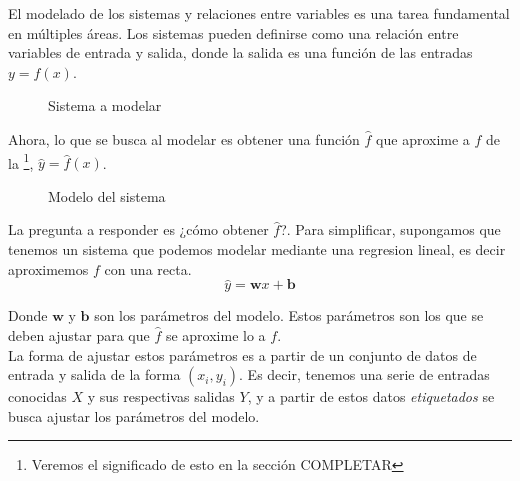El modelado de los sistemas y relaciones entre variables es una tarea fundamental en m\'ultiples \'areas.
Los sistemas pueden definirse como una relaci\'on entre variables de entrada y salida, donde la salida es una funci\'on de las entradas $y = f(x)$. \\

\begin{figure}[H]
    \centering
    \caption{Sistema a modelar}
\end{figure}


Ahora, lo que se busca al modelar es obtener una funci\'on $\hat{f}$ que aproxime a $f$ de la \footnote{Veremos el significado de esto en la secci\'on COMPLETAR}, $\hat{y} = \hat{f}(x)$. \\

\begin{figure}[H]
    \centering
    \caption{Modelo del sistema}
\end{figure}

La pregunta a responder es ¿cómo obtener $\hat{f}$?. Para simplificar, supongamos que tenemos un sistema que podemos modelar mediante una regresion lineal, es decir aproximemos $f$ con una recta. \\

\begin{equation}
    \hat{y} = \mathbf{w} x + \mathbf{b}
\end{equation}

Donde $\mathbf{w}$ y $\mathbf{b}$ son los par\'ametros del modelo. Estos par\'ametros son los que se deben ajustar para que $\hat{f}$ se aproxime lo  a $f$. \\

La forma de ajustar estos par\'ametros es a partir de un conjunto de datos de entrada y salida de la forma $\left(x_i, y_i\right)$. Es decir, tenemos una serie de entradas conocidas $X$ y sus respectivas salidas $Y$, y a partir de estos datos \textit{etiquetados} se busca ajustar los par\'ametros del modelo. \\

